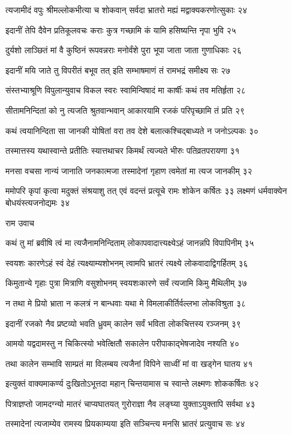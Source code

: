 त्यजामीदं वपुः श्रीमल्लोकभीत्या च शोकवान्
सर्वदा भ्रातरो मह्यं मद्वाक्यकरणोत्सुकाः २४

इदानीं तेपि दैवेन प्रतिकूलवचः कराः
कुत्र गच्छामि कं यामि हसिष्यन्ति नृपा भुवि २५

दुर्यशो लाञ्छितं मां वै कुष्ठिनं रूपवन्नराः
मनोर्वंशे पुरा भूपा जाता जाता गुणाधिकाः २६

इदानीं मयि जाते तु विपरीतं बभूव तत्
इति सम्भाषमाणं तं रामभद्रं समीक्ष्य सः २७

संस्तभ्याश्रूणि विपुलान्युवाच विकल स्वरः
स्वामिन्विषादं मा कार्षीः कथं तव मतिर्हृता २८

सीतामनिन्दितां को नु त्यजति श्रुतवान्भवान्
आकारयामि रजकं परिपृच्छामि तं प्रति २९

कथं त्वयानिन्दिता सा जानकी योषितां वरा
तव देशे बलात्कश्चिद्बाध्यते न जनोऽल्पकः ३०

तस्मात्तस्य यथास्वान्ते प्रतीतिः स्यात्तथाचर
किमर्थं त्यज्यते भीरुः पतिव्रतपरायणा ३१

मनसा वचसा नान्यं जानाति जनकात्मजा
तस्मादेनां गृहाण त्वमेतां मा त्यज जानकीम् ३२

ममोपरि कृपां कृत्वा मदुक्तं संश्रयाशु तत्
एवं वदन्तं प्रत्यूचे रामः शोकेन कर्षितः ३३
लक्ष्मणं धर्मवाक्येन बोधयंस्त्यजनोद्यमः ३४

राम उवाच

कथं तु मां ब्रवीषि त्वं मा त्यजैनामनिन्दिताम्
लोकापवादात्त्यक्ष्येऽहं जानन्नपि विपापिनीम् ३५

स्वयशः कारणेऽहं स्वं देहं त्यक्ष्याम्यशोभनम्
त्वामपि भ्रातरं त्यक्ष्ये लोकवादाद्विगर्हितम् ३६

किमुतान्ये गृहाः पुत्रा मित्राणि वसुशोभनम्
स्वयशःकारणे सर्वं त्यजामि किमु मैथिलीम् ३७

न तथा मे प्रियो भ्राता न कलत्रं न बान्धवाः
यथा मे विमलाकीर्तिर्वल्लभा लोकविश्रुता ३८

इदानीं रजको नैव प्रष्टव्यो भवति ध्रुवम्
कालेन सर्वं भविता लोकचित्तस्य रञ्जनम् ३९

आमयो यद्वदामस्तु न चिकित्स्यो भवेत्क्षितौ
सकालेन परीपाकाद्भेषजादेव नश्यति ४०

तथा कालेन सम्भावि साम्प्रतं मा विलम्बय
त्यजैनां विपिने साध्वीं मां वा खड्गेन घातय ४१

इत्युक्तं वाक्यमाकर्ण्य दुःखितोऽभूत्तदा महान्
चिन्तयामास च स्वान्ते लक्ष्मणः शोककर्षितः ४२

पित्राज्ञप्तो जामदग्न्यो मातरं चाप्यघातयत्
गुरोराज्ञा नैव लङ्घ्या युक्ताऽयुक्तापि सर्वथा ४३

तस्मादेनां त्यजाम्येव रामस्य प्रियकाम्यया
इति सञ्चिन्त्य मनसि भ्रातरं प्रत्युवाच सः ४४

